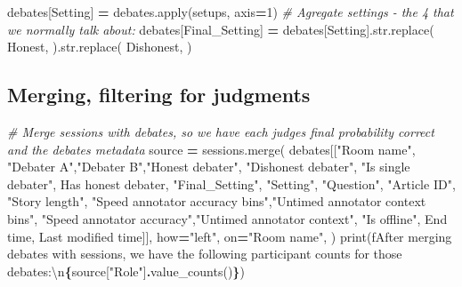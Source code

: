\documentclass[
]{article}
\newenvironment{Shaded}{\begin{snugshade}}{\end{snugshade}}
\newcommand{\BuiltInTok}[1]{#1}
\newcommand{\CharTok}[1]{\textcolor[rgb]{0.31,0.60,0.02}{#1}}
\newcommand{\CommentTok}[1]{\textcolor[rgb]{0.56,0.35,0.01}{\textit{#1}}}
\newcommand{\DecValTok}[1]{\textcolor[rgb]{0.00,0.00,0.81}{#1}}
\newcommand{\NormalTok}[1]{#1}
\newcommand{\OperatorTok}[1]{\textcolor[rgb]{0.81,0.36,0.00}{\textbf{#1}}}
\newcommand{\SpecialCharTok}[1]{\textcolor[rgb]{0.81,0.36,0.00}{\textbf{#1}}}
\newcommand{\SpecialStringTok}[1]{\textcolor[rgb]{0.31,0.60,0.02}{#1}}
\newcommand{\StringTok}[1]{\textcolor[rgb]{0.31,0.60,0.02}{#1}}
\begin{document}
\begin{Shaded}
\begin{Highlighting}[]
\NormalTok{debates[}\StringTok{\textquotesingle{}Setting\textquotesingle{}}\NormalTok{] }\OperatorTok{=}\NormalTok{ debates.}\BuiltInTok{apply}\NormalTok{(setups, axis}\OperatorTok{=}\DecValTok{1}\NormalTok{)}
\CommentTok{\# Agregate settings {-} the 4 that we normally talk about:}
\NormalTok{debates[}\StringTok{\textquotesingle{}Final\_Setting\textquotesingle{}}\NormalTok{] }\OperatorTok{=}\NormalTok{ debates[}\StringTok{\textquotesingle{}Setting\textquotesingle{}}\NormalTok{].}\BuiltInTok{str}\NormalTok{.replace(}\StringTok{\textquotesingle{} Honest\textquotesingle{}}\NormalTok{, }\StringTok{\textquotesingle{}\textquotesingle{}}\NormalTok{).}\BuiltInTok{str}\NormalTok{.replace(}\StringTok{\textquotesingle{} Dishonest\textquotesingle{}}\NormalTok{, }\StringTok{\textquotesingle{}\textquotesingle{}}\NormalTok{)}
\end{Highlighting}
\end{Shaded}

\subsection{Merging, filtering for
judgments}\label{merging-filtering-for-judgments}

\begin{Shaded}
\begin{Highlighting}[]
\CommentTok{\# Merge sessions with debates, so we have each judge\textquotesingle{}s final probability correct and the debate\textquotesingle{}s metadata}
\NormalTok{source }\OperatorTok{=}\NormalTok{ sessions.merge(}
\NormalTok{        debates[[}\StringTok{"Room name"}\NormalTok{, }\StringTok{"Debater A"}\NormalTok{,}\StringTok{"Debater B"}\NormalTok{,}\StringTok{"Honest debater"}\NormalTok{, }\StringTok{"Dishonest debater"}\NormalTok{,}
                 \StringTok{"Is single debater"}\NormalTok{, }\StringTok{\textquotesingle{}Has honest debater\textquotesingle{}}\NormalTok{,}
                 \StringTok{"Final\_Setting"}\NormalTok{, }\StringTok{"Setting"}\NormalTok{,}
                 \StringTok{"Question"}\NormalTok{, }\StringTok{"Article ID"}\NormalTok{, }\StringTok{"Story length"}\NormalTok{,}
                 \StringTok{"Speed annotator accuracy bins"}\NormalTok{,}\StringTok{"Untimed annotator context bins"}\NormalTok{,}
                 \StringTok{"Speed annotator accuracy"}\NormalTok{,}\StringTok{"Untimed annotator context"}\NormalTok{, }\StringTok{"Is offline"}\NormalTok{,}
                 \StringTok{\textquotesingle{}End time\textquotesingle{}}\NormalTok{, }\StringTok{\textquotesingle{}Last modified time\textquotesingle{}}\NormalTok{]],}
\NormalTok{        how}\OperatorTok{=}\StringTok{"left"}\NormalTok{,}
\NormalTok{        on}\OperatorTok{=}\StringTok{"Room name"}\NormalTok{,}
\NormalTok{    )}
\BuiltInTok{print}\NormalTok{(}\SpecialStringTok{f\textquotesingle{}After merging debates with sessions, we have the following participant counts for those debates:}\CharTok{\textbackslash{}n}\SpecialCharTok{\{}\NormalTok{source[}\StringTok{"Role"}\NormalTok{]}\SpecialCharTok{.}\NormalTok{value\_counts()}\SpecialCharTok{\}}\SpecialStringTok{\textquotesingle{}}\NormalTok{) }
\end{Highlighting}
\end{Shaded}
\end{document}
